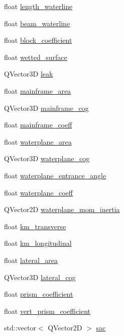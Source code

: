 \begin{DoxyCompactItemize}
\item 
float \hyperlink{structShipCAD_1_1HydrostaticsData_ae65aa54bcbfb059f11aa174cfaa0447b}{length\-\_\-waterline}
\item 
float \hyperlink{structShipCAD_1_1HydrostaticsData_ab79755f5814572be0dfd3ae3ba214fca}{beam\-\_\-waterline}
\item 
float \hyperlink{structShipCAD_1_1HydrostaticsData_ac59c717b9869f0aacca4305fd81d4882}{block\-\_\-coefficient}
\item 
float \hyperlink{structShipCAD_1_1HydrostaticsData_ad4b78176732ea80000adb94b5b5669f3}{wetted\-\_\-surface}
\item 
Q\-Vector3\-D \hyperlink{structShipCAD_1_1HydrostaticsData_a1132babc4274499418c2dc8ea6f86314}{leak}
\item 
float \hyperlink{structShipCAD_1_1HydrostaticsData_ab2b49d5dea89ae998116c8ff4cac2b53}{mainframe\-\_\-area}
\item 
Q\-Vector3\-D \hyperlink{structShipCAD_1_1HydrostaticsData_ab726ebe5c185d197a25e4477576266a4}{mainframe\-\_\-cog}
\item 
float \hyperlink{structShipCAD_1_1HydrostaticsData_a4208b97fe6110516d71e67708186897a}{mainframe\-\_\-coeff}
\item 
float \hyperlink{structShipCAD_1_1HydrostaticsData_a5f3432f4d790bbb9c4d75502cb15b7f0}{waterplane\-\_\-area}
\item 
Q\-Vector3\-D \hyperlink{structShipCAD_1_1HydrostaticsData_ac100876d13ae75147585c5c0f80801fe}{waterplane\-\_\-cog}
\item 
float \hyperlink{structShipCAD_1_1HydrostaticsData_a3e22cf4f03f02a3c0d14e7f66610fd80}{waterplane\-\_\-entrance\-\_\-angle}
\item 
float \hyperlink{structShipCAD_1_1HydrostaticsData_a4d5eb630367999a611b95dd0d2c2242c}{waterplane\-\_\-coeff}
\item 
Q\-Vector2\-D \hyperlink{structShipCAD_1_1HydrostaticsData_a2a662521564e9c0160c15acf9d3121f9}{waterplane\-\_\-mom\-\_\-inertia}
\item 
float \hyperlink{structShipCAD_1_1HydrostaticsData_adbadaf4eafa63f1f10778f4c3e1f61a4}{km\-\_\-transverse}
\item 
float \hyperlink{structShipCAD_1_1HydrostaticsData_a0a51e62f7d169fa892eaabc6a1937256}{km\-\_\-longitudinal}
\item 
float \hyperlink{structShipCAD_1_1HydrostaticsData_a1ba65b28e4351a4d97bc64cd11ddab90}{lateral\-\_\-area}
\item 
Q\-Vector3\-D \hyperlink{structShipCAD_1_1HydrostaticsData_adc0c4f2f0c5b110a968e45642dc5eeeb}{lateral\-\_\-cog}
\item 
float \hyperlink{structShipCAD_1_1HydrostaticsData_acabee310fcde293fcb0d9a5fd5effe27}{prism\-\_\-coefficient}
\item 
float \hyperlink{structShipCAD_1_1HydrostaticsData_a2a7fc6a194bc1e78ecce8ab16512d1eb}{vert\-\_\-prism\-\_\-coefficient}
\item 
std\-::vector$<$ Q\-Vector2\-D $>$ \hyperlink{structShipCAD_1_1HydrostaticsData_a503a1f2299db9d5ae923e598b8ee31ba}{sac}
\end{DoxyCompactItemize}


